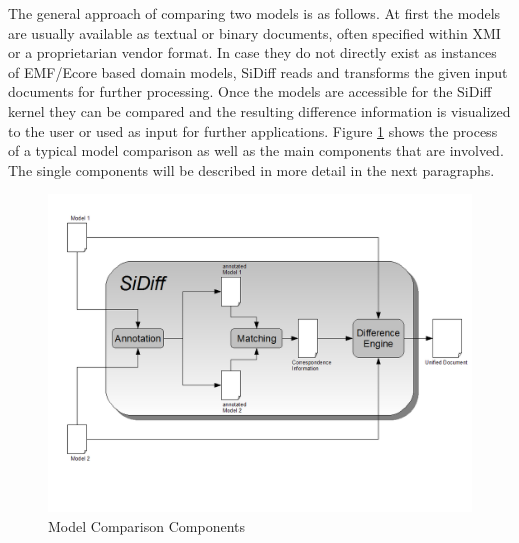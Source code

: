 \documentclass{article}
\begin{document}



The general approach of comparing two models is as follows. At first the models are usually available as 
textual or binary documents, often specified within XMI or a proprietarian vendor format. 
In case they do not directly exist as instances of EMF/Ecore based domain models, 
SiDiff reads and transforms the given input documents for further processing. Once the models are 
accessible for the SiDiff kernel they can be compared and the resulting difference 
information is visualized to the user or used as input for further applications. 
Figure \ref{figarchitecturecomps} shows the process of a typical 
model comparison as well as the main components that are involved. The single components 
will be described in more detail in the next paragraphs.

\begin{figure}[h]
\centering
\includegraphics[width=\linewidth]{sidiffworkflow.png}
\caption{Model Comparison Components}
\label{figarchitecturecomps}
\end{figure}
\end{document}
